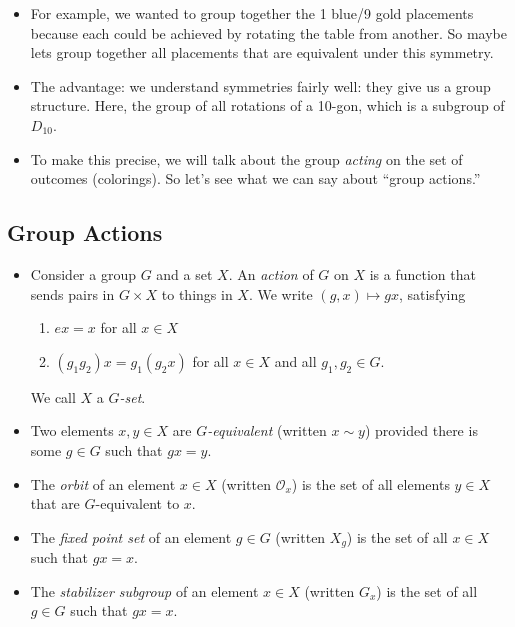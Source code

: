 \documentclass[12pt]{article}
\theoremstyle{plain}
\theoremstyle{definition}
\theoremstyle{remark}
\newcommand{\todayis}[1]{\clearpage{\rhead{\footnotesize #1}}}
\begin{document}
\begin{itemize}
\item For example, we wanted to group together the 1 blue/9 gold placements because each could be achieved by rotating the table from another.  So maybe lets group together all placements that are equivalent under this symmetry.

\item The advantage: we understand symmetries fairly well: they give us a group structure.  Here, the group of all rotations of a 10-gon, which is a subgroup of $D_{10}$.

\item To make this precise, we will talk about the group \emph{acting} on the set of outcomes (colorings). So let's see what we can say about ``group actions.''

\end{itemize}

\todayis{Wednesday, April 10}
\subsection*{Group Actions}

\begin{itemize}

\item Consider a group $G$ and a set $X$.  An {\em action} of $G$ on $X$ is a function that sends pairs in $G \times X$ to things in $X$.  We write $(g,x) \mapsto gx$, satisfying
\begin{enumerate}
\item $ex = x$ for all $x \in X$
\item $(g_1g_2)x = g_1(g_2x)$ for all $x \in X$ and all $g_1, g_2\in G$.
\end{enumerate}
We call $X$ a {\em $G$-set}.

\item Two elements $x, y \in X$ are {\em $G$-equivalent} (written $x \sim y$) provided there is some $g \in G$ such that $gx = y$.

\item The {\em orbit} of an element $x \in X$ (written $\mathcal{O}_x$) is the set of all elements $y \in X$ that are $G$-equivalent to $x$.

\item The {\em fixed point set} of an element $g \in G$ (written $X_g$) is the set of all $x \in X$ such that $gx = x$.

\item The {\em stabilizer subgroup} of an element $x \in X$ (written $G_x$) is the set of all $g \in G$ such that $gx = x$.
\end{itemize}
\end{document}
